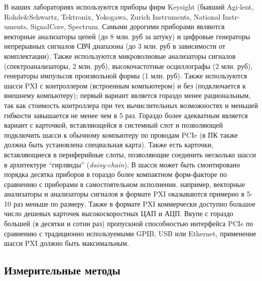 \documentclass[14pt, a4paper]{extreport}
\numberwithin{equation}{section}
\begin{document}
В наших лабораториях используются приборы фирм Keysight (бывший Agi-lent, Rohde\&Schwartz, Tektronix, Yokogawa, Zurich Instruments, National Instr-uments, SignalCore, Spectrum. Самыми дорогими приборами являются векторные анализаторы цепей (до 8 млн. руб за штуку) и цифровые генераторы непрерывных сигналов СВЧ диапазона (до 3 млн. руб в зависимости от комплектации). Также используются микроволновые анализаторы сигналов (спектроанализаторы, 2 млн. руб), высокочастотные осциллографы (2 млн. руб), генераторы импульсов произвольной формы (1 млн. руб). Также используются шасси PXI с контроллером (встроенным компьютером) и без (подключается к внешнему компьютеру); первый вариант является гораздо менее рациональным, так как стоимость контроллера при тех вычислительных возможностях и меньшей гибкости завышается не менее чем в 5 раз. Гораздо более адекватным является вариант с карточкой, вставляющейся в системный слот и позволяющей подключить шасси к обычному компьютеру по проводам PCIe (в ПК также должна быть установлена специальная карта). Также есть карточки, вставляющиеся в периферийные слоты, позволяющие соединить несколько шасси в архитектуре ``гирлянды'' (\textit{daisy-chain}). В шасси может быть смонтировано порядка десятка приборов в гораздо более компактном форм-факторе по сравнению с приборами в самостоятельном исполнении. например, векторные анализаторы и анализаторы сигналов в формате PXI оказываются примерно в 5-10 раз меньше по размеру. Также в формате PXI коммерчески доступно большое число дешевых карточек высокоскоростных ЦАП и АЦП. Вкупе с гораздо большей (в десятки и сотни раз) пропускной способностью интерфейса PCIe по сравнению с традиционно используемыми GPIB, USB или Ethernet, применение шасси PXI должно быть максимальным.

\subsection{Измерительные методы}
\end{document}

